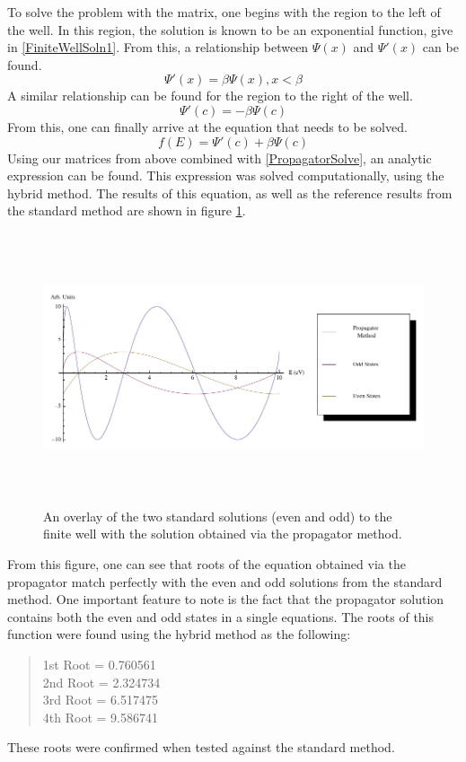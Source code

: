 \documentclass[12pt]{article}
\begin{document}
To solve the problem with the matrix, one begins with the region to the left of the well.  In this region, the solution is known to be an exponential function, give in \eqref{FiniteWellSoln1}.  From this, a relationship between $\Psi(x)$ and $\Psi'(x)$ can be found.
\begin{equation}
\label{DerivRelation1}
\Psi'(x)=\beta\Psi(x),      x < \beta
\end{equation}
A similar relationship can be found for the region to the right of the well.
\begin{equation}
\label{DerivRelation1}
\Psi'(c)=-\beta\Psi(c)
\end{equation}
From this, one can finally arrive at the equation that needs to be solved.
\begin{equation}
\label{PropagatorSolve}
f(E)=\Psi'(c)+\beta\Psi(c)
\end{equation}
Using our matrices from above combined with \eqref{PropagatorSolve}, an analytic expression can be found.  This expression was solved computationally, using the hybrid method.  The results of this equation, as well as the reference results from the standard method are shown in figure \ref{fig:FiniteWell}.
\begin{figure}[!h]
\centering
\includegraphics[width =150 mm, height = 80mm]{FiniteWell.pdf}
\caption{An overlay of the two standard solutions (even and odd) to the finite well with the solution obtained via the propagator method.}
\label{fig:FiniteWell}
\end{figure}
From this figure, one can see that roots of the equation obtained via the propagator match perfectly with the even and odd solutions from the standard method.  One important feature to note is the fact that the propagator solution contains both the even and odd states in a single equations.  The roots of this function were found using the hybrid method as the following:
\begin{quote}
\begin{center}
1st Root = 0.760561\\
2nd Root = 2.324734 \\
3rd Root = 6.517475 \\
4th Root = 9.586741 \\
\end{center}
\end{quote}
These roots were confirmed when tested against the standard method.
\end{document}

